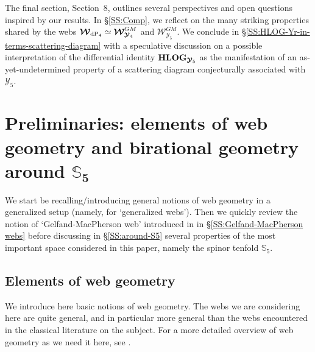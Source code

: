 \documentclass[11pt]{amsart}
\newcommand{\sk}{\smallskip}
\begin{document}
The final section, Section~8, outlines several perspectives and open questions inspired by our results. In \S\ref{SS:Comp}, we reflect on the many striking properties shared by the webs $ \boldsymbol{\mathcal W}_{ {\rm  dP}_4} 
\simeq 
\boldsymbol{\mathcal W}^{GM}_{ \boldsymbol{\mathcal Y}_4} $  and 
$ \boldsymbol{\mathcal W}^{GM}_{ \boldsymbol{\mathcal Y}_5} $. 
We conclude in \S\ref{SS:HLOG-Yr-in-terms-scattering-diagram}  with a speculative discussion on a possible interpretation of the differential identity ${\bf HLOG}_{\boldsymbol{\mathcal Y}_5}$ as the manifestation of an as-yet-undetermined property of a scattering diagram conjecturally associated with $\boldsymbol{\mathcal Y}_5$. 















\section{\bf Preliminaries: elements of web geometry and birational geometry around 
$\boldsymbol{{\mathbb S}_5}$}
\label{S:Prelim}
We start be recalling/introducing general notions of web geometry in a generalized setup (namely, for `generalized webs'). Then we quickly review the notion of `Gelfand-MacPherson web' introduced in \cite{PirioAFST} in \S\ref{SS:Gelfand-MacPherson webs} before discussing  in \S\ref{SS:around-S5} several properties of the most important space considered in this paper, namely 
  the spinor tenfold $\mathbb S_5$. 



\subsection{\bf Elements of web geometry}
\label{SS:Elements-web-geometry}
We introduce here basic notions of web geometry. The webs we are considering here are quite general, and in particular more general than the webs encountered in the classical literature on the subject.  For a more detailed overview of web geometry as we need it here, see \cite[\S1]{ClusterWebs}.
\sk 
\end{document}
